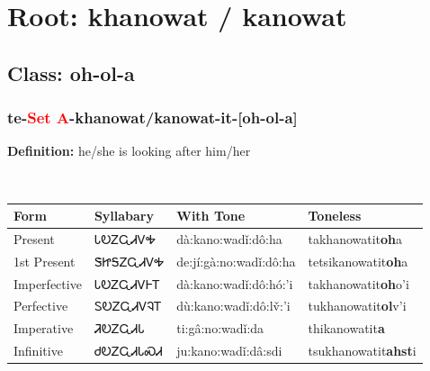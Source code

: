 \needspace{4in}
\section*{Root: khanowat / kanowat}
\nopagebreak
{}
\needspace{3in}
\subsection*{Class: oh-ol-a}
\nopagebreak
\needspace{2in}
\subsubsection*{te{-}\textcolor{Red}{Set A}{-}\textbf{khanowat/kanowat}{-}it{-}[oh-ol-a]}
\nopagebreak
\textbf{Definition: } he/she is looking after him/her
\\[0.5em]
\begin{tabularx}{\textwidth}{l X X X}%
\toprule%
\textbf{Form}&\textbf{Syllabary}&\textbf{With Tone}&\textbf{Toneless}\\%
\midrule%
Present&ᏓᎧᏃᏩᏗᏙᎭ&dà:kano:wadǐ:dô:ha&takhanowatit\textbf{oh}a\\%
1st Present&ᏕᏥᎦᏃᏩᏗᏙᎭ&de:jí:gà:no:wadǐ:dô:ha&tetsikanowatit\textbf{oh}a\\%
Imperfective&ᏓᎧᏃᏩᏗᏙᎰᎢ&dà:kano:wadǐ:dô:hó:’i&takhanowatit\textbf{oh}o'i\\%
Perfective&ᏚᎧᏃᏩᏗᏙᎸᎢ&dù:kano:wadǐ:dô:lv̌:’i&tukhanowatit\textbf{ol}v'i\\%
Imperative&ᏘᎧᏃᏩᏗᏓ&ti:gâ:no:wadǐ:da&thikanowatit\textbf{a}\\%
Infinitive&ᏧᎧᏃᏩᏗᏓᏍᏗ&ju:kano:wadǐ:dâ:sdi&tsukhanowatit\textbf{ahst}i\\%
\bottomrule%
\end{tabularx}
\\[1em]